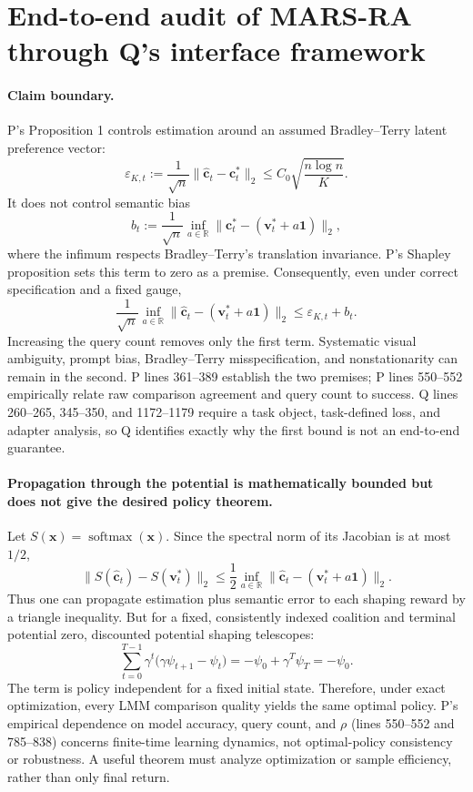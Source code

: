 \documentclass{article}
\begin{document}
\section*{End-to-end audit of MARS-RA through Q's interface framework}

\paragraph{Claim boundary.}
P's Proposition 1 controls estimation around an assumed Bradley--Terry latent
preference vector:
\[
  \varepsilon_{K,t}:=\frac{1}{\sqrt n}
  \lVert \widehat{\mathbf c}_t-\mathbf c_t^*\rVert_2
  \leq C_0\sqrt{\frac{n\log n}{K}}.
\]
It does not control semantic bias
\[
  b_t:=\frac{1}{\sqrt n}
  \inf_{a\in\mathbb R}
  \lVert \mathbf c_t^*-(\mathbf v_t^*+a\mathbf 1)\rVert_2,
\]
where the infimum respects Bradley--Terry's translation invariance.  P's
Shapley proposition sets this term to zero as a premise.  Consequently, even
under correct specification and a fixed gauge,
\[
  \frac{1}{\sqrt n}\inf_{a\in\mathbb R}
  \lVert\widehat{\mathbf c}_t-(\mathbf v_t^*+a\mathbf 1)\rVert_2
  \leq \varepsilon_{K,t}+b_t.
\]
Increasing the query count removes only the first term.  Systematic visual
ambiguity, prompt bias, Bradley--Terry misspecification, and nonstationarity
can remain in the second.  P lines 361--389 establish the two premises; P
lines 550--552 empirically relate raw comparison agreement and query count to
success.  Q lines 260--265, 345--350, and 1172--1179 require a task object,
task-defined loss, and adapter analysis, so Q identifies exactly why the first
bound is not an end-to-end guarantee.

\paragraph{Propagation through the potential is mathematically bounded but
does not give the desired policy theorem.}
Let \(S(\mathbf x)=\operatorname{softmax}(\mathbf x)\).  Since the spectral
norm of its Jacobian is at most \(1/2\),
\[
  \lVert S(\widehat{\mathbf c}_t)-S(\mathbf v_t^*)\rVert_2
  \leq \frac{1}{2}\inf_{a\in\mathbb R}
  \lVert\widehat{\mathbf c}_t-(\mathbf v_t^*+a\mathbf 1)\rVert_2.
\]
Thus one can propagate estimation plus semantic error to each shaping reward
by a triangle inequality.  But for a fixed, consistently indexed coalition
and terminal potential zero, discounted potential shaping telescopes:
\[
  \sum_{t=0}^{T-1}\gamma^t
  \bigl(\gamma\psi_{t+1}-\psi_t\bigr)
  =-\psi_0+\gamma^T\psi_T=-\psi_0.
\]
The term is policy independent for a fixed initial state.  Therefore, under
exact optimization, every LMM comparison quality yields the same optimal
policy.  P's empirical dependence on model accuracy, query count, and
\(\rho\) (lines 550--552 and 785--838) concerns finite-time learning dynamics,
not optimal-policy consistency or robustness.  A useful theorem must analyze
optimization or sample efficiency, rather than only final return.
\end{document}
